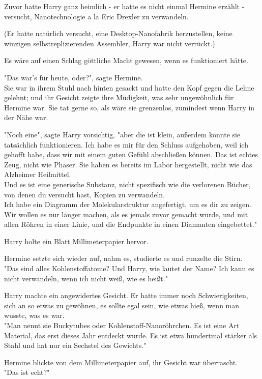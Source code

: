 {Zuvor hatte Harry ganz heimlich - er hatte es nicht einmal Hermine erzählt - versucht, Nanotechnologie a la Eric Drexler zu verwandeln.

(Er hatte natürlich versucht, eine Desktop-Nanofabrik herzustellen, keine winzigen selbstreplizierenden Assembler, Harry war nicht verrückt.)

Es wäre auf einen Schlag göttliche Macht gewesen, wenn es funktioniert hätte.

"Das war's für heute, oder?", sagte Hermine.\\ Sie war in ihrem Stuhl nach hinten gesackt und hatte den Kopf gegen die Lehne gelehnt; und ihr Gesicht zeigte ihre Müdigkeit, was sehr ungewöhnlich für Hermine war. Sie tat gerne so, als wäre sie grenzenlos, zumindest wenn Harry in der Nähe war.

"Noch eine", sagte Harry vorsichtig, "aber die ist klein, außerdem könnte sie tatsächlich funktionieren. Ich habe es mir für den Schluss aufgehoben, weil ich gehofft habe, dass wir mit einem guten Gefühl abschließen können. Das ist echtes Zeug, nicht wie Phaser. Sie haben es bereits im Labor hergestellt, nicht wie das Alzheimer Heilmittel.\\ Und es ist eine generische Substanz, nicht spezifisch wie die verlorenen Bücher, von denen du versucht hast, Kopien zu verwandeln.\\ Ich habe ein Diagramm der Molekularstruktur angefertigt, um es dir zu zeigen. Wir wollen es nur länger machen, als es jemals zuvor gemacht wurde, und mit allen Röhren in einer Linie, und die Endpunkte in einen Diamanten eingebettet."

Harry holte ein Blatt Millimeterpapier hervor.

Hermine setzte sich wieder auf, nahm es, studierte es und runzelte die Stirn.\\ "Das sind alles Kohlenstoffatome? Und Harry, wie lautet der Name? Ich kann es nicht verwandeln, wenn ich nicht weiß, wie es heißt."

Harry machte ein angewidertes Gesicht. Er hatte immer noch Schwierigkeiten, sich an so etwas zu gewöhnen, es sollte egal sein, wie etwas hieß, wenn man wusste, was es war.\\ "Man nennt sie Buckytubes oder Kohlenstoff-Nanoröhrchen. Es ist eine Art Material, das erst dieses Jahr entdeckt wurde. Es ist etwa hundertmal stärker als Stahl und hat nur ein Sechstel des Gewichts."

Hermine blickte von dem Millimeterpapier auf, ihr Gesicht war überrascht.\\ "Das ist echt?"

}
